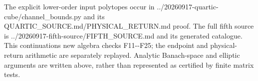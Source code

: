 \documentclass[11pt,a4paper]{article}
\begin{document}
The explicit lower-order input polytopes occur in
{.\allowbreak{}.\allowbreak{}/\allowbreak{}2\allowbreak{}0\allowbreak{}2\allowbreak{}6\allowbreak{}0\allowbreak{}9\allowbreak{}1\allowbreak{}7\allowbreak{}-\allowbreak{}q\allowbreak{}u\allowbreak{}a\allowbreak{}r\allowbreak{}t\allowbreak{}i\allowbreak{}c\allowbreak{}-\allowbreak{}c\allowbreak{}u\allowbreak{}b\allowbreak{}e\allowbreak{}/\allowbreak{}c\allowbreak{}h\allowbreak{}a\allowbreak{}n\allowbreak{}n\allowbreak{}e\allowbreak{}l\allowbreak{}\_\allowbreak{}b\allowbreak{}o\allowbreak{}u\allowbreak{}n\allowbreak{}d\allowbreak{}s\allowbreak{}.\allowbreak{}p\allowbreak{}y\allowbreak{}}
and its
{Q\allowbreak{}U\allowbreak{}A\allowbreak{}R\allowbreak{}T\allowbreak{}I\allowbreak{}C\allowbreak{}\_\allowbreak{}S\allowbreak{}O\allowbreak{}U\allowbreak{}R\allowbreak{}C\allowbreak{}E\allowbreak{}.\allowbreak{}m\allowbreak{}d\allowbreak{}/\allowbreak{}P\allowbreak{}H\allowbreak{}Y\allowbreak{}S\allowbreak{}I\allowbreak{}C\allowbreak{}A\allowbreak{}L\allowbreak{}\_\allowbreak{}R\allowbreak{}E\allowbreak{}T\allowbreak{}U\allowbreak{}R\allowbreak{}N\allowbreak{}.\allowbreak{}m\allowbreak{}d\allowbreak{}}
proof. The full fifth source is
{.\allowbreak{}.\allowbreak{}/\allowbreak{}2\allowbreak{}0\allowbreak{}2\allowbreak{}6\allowbreak{}0\allowbreak{}9\allowbreak{}1\allowbreak{}7\allowbreak{}-\allowbreak{}f\allowbreak{}i\allowbreak{}f\allowbreak{}t\allowbreak{}h\allowbreak{}-\allowbreak{}s\allowbreak{}o\allowbreak{}u\allowbreak{}r\allowbreak{}c\allowbreak{}e\allowbreak{}/\allowbreak{}F\allowbreak{}I\allowbreak{}F\allowbreak{}T\allowbreak{}H\allowbreak{}\_\allowbreak{}S\allowbreak{}O\allowbreak{}U\allowbreak{}R\allowbreak{}C\allowbreak{}E\allowbreak{}.\allowbreak{}m\allowbreak{}d\allowbreak{}}
and its generated catalogue. This continuation\textquotesingle s new
algebra checks F11-\/-F25; the endpoint and physical-return arithmetic
are separately replayed. Analytic Banach-space and elliptic arguments
are written above, rather than represented as certified by finite matrix
tests.
\end{document}
